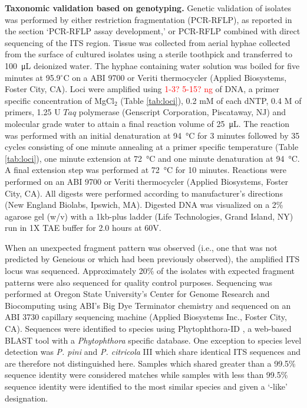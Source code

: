 \documentclass[12pt]{article}
\begin{document}
\textbf{Taxonomic validation based on genotyping.} Genetic validation of isolates was performed by either restriction fragmentation (PCR-RFLP), as reported in the section `PCR-RFLP assay development,' or PCR-RFLP combined with direct sequencing of the ITS region.  Tissue was collected from aerial hyphae collected from the surface of cultured isolates using a sterile toothpick and transferred to \SI{100}{\micro\liter} deionized water.  The hyphae containing water solution was boiled for five minutes at 95.9$^\circ$C on a ABI 9700 or Veriti thermocycler (Applied Biosystems, Foster City, CA).  Loci were amplified using \textcolor{red}{1-3? 5-15? ng} of DNA, a primer specific concentration of MgCl$_{2}$ (Table \ref{tab:loci}), 0.2 mM of each dNTP, 0.4 \textmu M of primers, 1.25 U $Taq$ polymerase (Genscript Corporation, Piscataway, NJ) and molecular grade water to attain a final reaction volume of \SI{25}{\micro\liter}.  The reaction was performed with an initial denaturation at \SI{94}{\celsius} for 3 minutes followed by 35 cycles consisting of one minute annealing at a primer specific temperature (Table \ref{tab:loci}), one minute extension at \SI{72}{\celsius} and one minute denaturation at \SI{94}{\celsius}.  A final extension step was performed at \SI{72}{\celsius} for 10 minutes.  Reactions were performed on an ABI 9700 or Veriti thermocycler (Applied Biosystems, Foster City, CA).  All digests were performed according to manufacturer's directions (New England Biolabs, Ipswich, MA).  Digested DNA was visualized on a 2\% agarose gel (w/v) with a 1kb-plus ladder (Life Technologies, Grand Island, NY) run in 1X TAE buffer for 2.0 hours at 60V.

When an unexpected fragment pattern was observed (i.e., one that was not predicted by Geneious or which had been previously observed), the amplified ITS locus was sequenced.  Approximately 20\% of the isolates with expected fragment patterns were also sequenced for quality control purposes.  Sequencing was performed at Oregon State University's Center for Genome Research and Biocomputing using ABI's Big Dye Terminator chemistry and sequenced on an ABI 3730 capillary sequencing machine (Applied Biosystems Inc., Foster City, CA).  Sequences were identified to species using Phytophthora-ID \cite{grunwald_etal_2011}, a web-based BLAST \cite{altschul_etal_1990} tool with a \emph{Phytophthora} specific database.  One exception to species level detection was \emph{P. pini} and \emph{P. citricola} III which share identical ITS sequences\cite{hong2011} and are therefore not distinguished here.  Samples which shared greater than a 99.5\% sequence identity were considered matches while samples with less than 99.5\% sequence identity were identified to the most similar species and given a `-like' designation.
\end{document}
